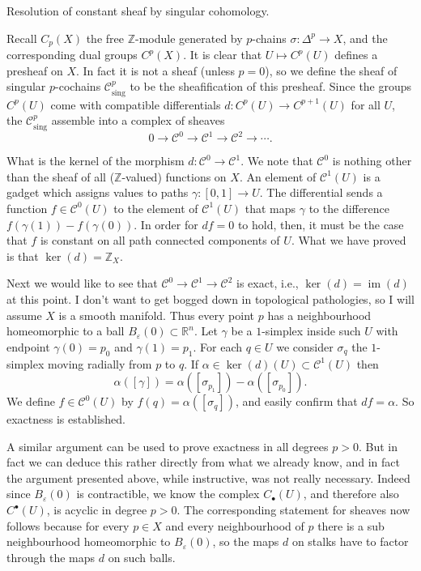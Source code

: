 \medskip\noindent
Resolution of constant sheaf by singular cohomology.

\begin{definition}
\label{definition-singular-cochain-sheaf}
Recall $C_p(X)$ the free $\mathbb Z$-module generated by $p$-chains $\sigma:\Delta^p\to X$, and
the corresponding dual groups $C^p(X)$. It is clear that $U\mapsto C^p(U)$ defines a presheaf on
$X$. In fact it is not a sheaf (unless $p=0$), so we define the sheaf of singular $p$-cochains
$\mathcal C^p_{\mathrm{sing}}$ to be the sheafification of this presheaf. Since the groups $C^p(U)$ come with compatible
differentials $d:C^p(U)\to C^{p+1}(U)$ for all $U$, the $\mathcal C^p_{\mathrm{sing}}$ assemble into a complex of sheaves
\[
0\to\mathcal C^0\to\mathcal C^1\to\mathcal C^2\to\cdots.
\]
\end{definition}

What is the kernel of the morphism $d:\mathcal C^0\to\mathcal C^1$. We note that $\mathcal C^0$ is nothing other than
the sheaf of all ($\mathbb Z$-valued) functions on $X$. An element of $\mathcal C^1(U)$ is a gadget which assigns
values to paths $\gamma:[0,1]\to U$. The differential sends a function $f\in\mathcal C^0(U)$ to the element of
$\mathcal C^1(U)$ that maps $\gamma$ to the difference $f(\gamma(1))-f(\gamma(0))$. In order for $df=0$ to hold, then, it
must be the case that $f$ is constant on all path connected components of $U$. What we have
proved is that $\ker(d)=\mathbb Z_X$.

Next we would like to see that $\mathcal C^0\to\mathcal C^1\to\mathcal C^2$ is exact, i.e.,
$\ker(d)=\operatorname{im}(d)$ at this point. I don't want to get bogged down in topological pathologies, so I will assume $X$ is a smooth
manifold. Thus every point $p$ has a neighbourhood homeomorphic to a ball $B_\varepsilon(0)\subset\mathbb R^n$. Let
$\gamma$ be a $1$-simplex inside such $U$ with endpoint $\gamma(0)=p_0$ and $\gamma(1)=p_1$. For each $q\in U$ we
consider $\sigma_q$ the $1$-simplex moving radially from $p$ to $q$. If
$\alpha\in\ker(d)(U)\subset\mathcal C^1(U)$ then
\[
\alpha([\gamma])=\alpha([\sigma_{p_1}])-\alpha([\sigma_{p_0}]).
\]
We define $f\in\mathcal C^0(U)$ by $f(q)=\alpha([\sigma_q])$, and easily confirm that $df=\alpha$. So exactness is
established.

A similar argument can be used to prove exactness in all degrees $p>0$. But in fact we can
deduce this rather directly from what we already know, and in fact the argument presented
above, while instructive, was not really necessary. Indeed since $B_\varepsilon(0)$ is contractible, we know
the complex $C_\bullet(U)$, and therefore also $C^\bullet(U)$, is acyclic in degree $p>0$. The corresponding
statement for sheaves now follows because for every $p\in X$ and every neighbourhood of $p$
there is a sub neighbourhood homeomorphic to $B_\varepsilon(0)$, so the maps $d$ on stalks have to factor
through the maps $d$ on such balls.
\label{proposition-singular-cochains-resolve-constant-sheaf}

